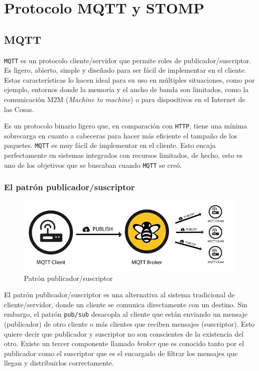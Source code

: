 \chapter{Protocolo MQTT y STOMP}
\pagestyle{esitscCD}

\section{MQTT}

\texttt{MQTT} es un protocolo cliente/servidor que permite roles de publicador/suscriptor.
Es ligero, abierto, simple y diseñado para ser fácil de implementar en el cliente.
Estas características lo hacen ideal para su uso en múltiples situaciones, como por ejemplo,
entornos donde la memoria y el ancho de banda son limitados, como la comunicación M2M
(\emph{Machine to machine}) o para dispositivos en el Internet de las Cosas.

Es un protocolo binario ligero que, en comparación con \texttt{HTTP}, tiene una
mínima sobrecarga en cuanto a cabeceras para hacer más eficiente el tampaño de los
paquetes.
\texttt{MQTT} es muy fácil de implementar en el cliente. Esto encaja perfectamente
en sistemas integrados con recursos limitados, de hecho,
esto es uno de los objetivos que se buscaban cuando \texttt{MQTT} se creó.

\subsection{El patrón publicador/suscriptor}

\begin{figure}[htbp]
\centering
\includegraphics[width=\linewidth]{03-mqtt_stomp_amqp/figuras/fig001}
\caption{Patrón publicador/suscriptor}
\label{fig:figura1}
\end{figure}

El patrón publicador/suscriptor es una alternativa al sistema tradicional de
cliente/servidor, donde un cliente se comunica directamente con un destino.
Sin embargo, el patrón \texttt{pub/sub} desacopla al cliente que están enviando
un mensaje (publicador) de otro cliente o más clientes que reciben mensajes
(suscriptor). Esto quiere decir que publicador y suscriptor no son conscientes
de la existencia del otro. Existe un tercer componente llamado \emph{broker} que
es conocido tanto por el publicador como el suscriptor que es el encargado de
filtrar los mensajes que llegan y distribuirlos correctamente.

